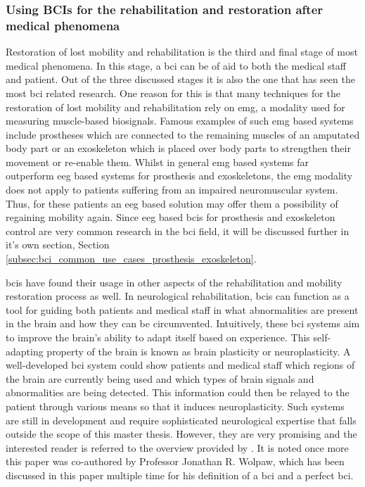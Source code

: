 
\subsubsection{Using BCIs for the rehabilitation and restoration after medical phenomena}
\label{subsubsec:bci_common_use_cases_medical_phenomena_restoration}

Restoration of lost mobility and rehabilitation is the third and final stage of most medical phenomena.
In this stage, a \gls{bci} can be of aid to both the medical staff and patient.
Out of the three discussed stages it is also the one that has seen the most \gls{bci} related research.
One reason for this is that many techniques for the restoration of lost mobility and rehabilitation rely on \gls{emg}, a modality used for measuring muscle-based \glspl{biosignal}.
Famous examples of such \gls{emg} based systems include prostheses which are connected to the remaining muscles of an amputated body part or an exoskeleton which is placed over body parts to strengthen their movement or re-enable them. 
Whilst in general \gls{emg} based systems far outperform \gls{eeg} based systems for prosthesis and exoskeletons, the \gls{emg} modality does not apply to patients suffering from an impaired neuromuscular system.
Thus, for these patients an \gls{eeg} based solution may offer them a possibility of regaining mobility again.
Since \gls{eeg} based \glspl{bci} for prosthesis and exoskeleton control are very common research in the \gls{bci} field, it will be discussed further in it's own section, Section \ref{subsec:bci_common_use_cases_prosthesis_exoskeleton}.

\Glspl{bci} have found their usage in other aspects of the rehabilitation and mobility restoration process as well.
In neurological rehabilitation, \glspl{bci} can function as a tool for guiding both patients and medical staff in what abnormalities are present in the brain and how they can be circumvented.
Intuitively, these \gls{bci} systems aim to improve the brain's ability to adapt itself based on experience.
This self-adapting property of the brain is known as brain plasticity or neuroplasticity.
A well-developed \gls{bci} system could show patients and medical staff which regions of the brain are currently being used and which types of brain signals and abnormalities are being detected.
This information could then be relayed to the patient through various means so that it induces neuroplasticity.
Such systems are still in development and require sophisticated neurological expertise that falls outside the scope of this master thesis.
However, they are very promising and the interested reader is referred to the overview provided by \citet{bci_rehabilitation}.
It is noted once more this paper was co-authored by Professor Jonathan R. Wolpaw, which has been discussed in this paper multiple time for his definition of a \gls{bci} and a perfect \gls{bci}.

